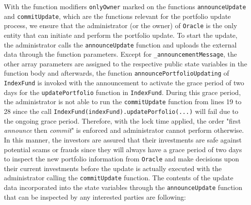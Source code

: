 With the function modifiers \texttt{onlyOwner} marked on the functions \texttt{announceUpdate} and \texttt{commitUpdate}, which are the functions relevant for the portfolio update process, we ensure that the administrator (or the owner) of \texttt{Oracle} is the only entity that can initiate and perform the portfolio update. To start the update, the administrator calls the \texttt{announceUpdate} function and uploads the external data through the function parameters. Except for \texttt{\_announcementMessage}, the other array parameters are assigned to the respective public state variables in the function body and afterwards, the function \texttt{announcePortfolioUpdating} of \texttt{IndexFund} is invoked with the announcement to activate the grace period of two days for the \texttt{updatePortfolio} function in \texttt{IndexFund}. During this grace period, the administrator is not able to run the \texttt{commitUpdate} function from lines 19 to 28 since the call \texttt{IndexFund(indexFund).updatePorfolio(...)} will fail due to the ongoing grace period. Therefore, with the lock time applied, the order "first \textit{announce} then \textit{commit}" is enforced and administrator cannot perform otherwise. In this manner, the investors are assured that their investments are safe against potential scams or frauds since they will always have a grace period of two days to inspect the new portfolio information from \texttt{Oracle} and make decisions upon their current investments before the update is actually executed with the administrator calling the \texttt{commitUpdate} function. The contents of the update data incorporated into the state variables through the \texttt{announceUpdate} function that can be inspected by any interested parties are following:

